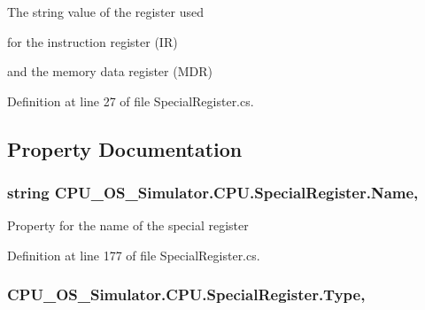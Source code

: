 The string value of the register used 

for the instruction register (I\+R) 

and the memory data register (M\+D\+R) 

Definition at line 27 of file Special\+Register.\+cs.



\subsection{Property Documentation}
\hypertarget{class_c_p_u___o_s___simulator_1_1_c_p_u_1_1_special_register_ad8ad1efaf680db5471184a74f911b558}{}
\subsubsection[{Name}]{\setlength{\rightskip}{0pt plus 5cm}string C\+P\+U\+\_\+\+O\+S\+\_\+\+Simulator.\+C\+P\+U.\+Special\+Register.\+Name\hspace{0.3cm}{\ttfamily [get]}, {\ttfamily [set]}}\label{class_c_p_u___o_s___simulator_1_1_c_p_u_1_1_special_register_ad8ad1efaf680db5471184a74f911b558}


Property for the name of the special register 



Definition at line 177 of file Special\+Register.\+cs.

\hypertarget{class_c_p_u___o_s___simulator_1_1_c_p_u_1_1_special_register_afd9e45080d792861e577dde31cdb6d3e}{}
\subsubsection[{Type}]{ C\+P\+U\+\_\+\+O\+S\+\_\+\+Simulator.\+C\+P\+U.\+Special\+Register.\+Type\hspace{0.3cm}{\ttfamily [get]}, {\ttfamily [set]}}\label{class_c_p_u___o_s___simulator_1_1_c_p_u_1_1_special_register_afd9e45080d792861e577dde31cdb6d3e}


